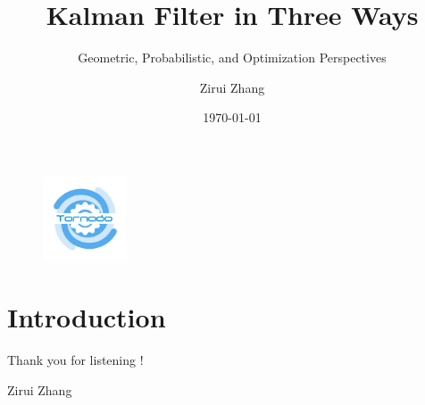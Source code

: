 \documentclass[serif, aspectratio=169]{beamer}
\author{Zirui Zhang}
\title{Kalman Filter in Three Ways}
\subtitle{Geometric, Probabilistic, and Optimization Perspectives}
\institute{
    Cheng Kar-Shun Robotics Institute \\
    The Hong Kong University of Science and Technology \\
}
\date{\small \today}
\begin{document}
\begin{frame}
    \titlepage
    \vspace*{-0.6cm}
    \begin{figure}[htpb]
        \begin{center}
            \includegraphics[keepaspectratio, width=2.5cm]{pic/tornado.png}
        \end{center}
    \end{figure}
\end{frame}

\begin{frame}    
\tableofcontents[sectionstyle=show,
subsectionstyle=show/shaded/hide,
subsubsectionstyle=show/shaded/hide]
\end{frame}

\section{Introduction}

\begin{frame}
\begin{center}
{ Thank you for listening !}
\vspace{1cm}

Zirui Zhang \\[1em]
\end{center}
\end{frame}
\end{document}

